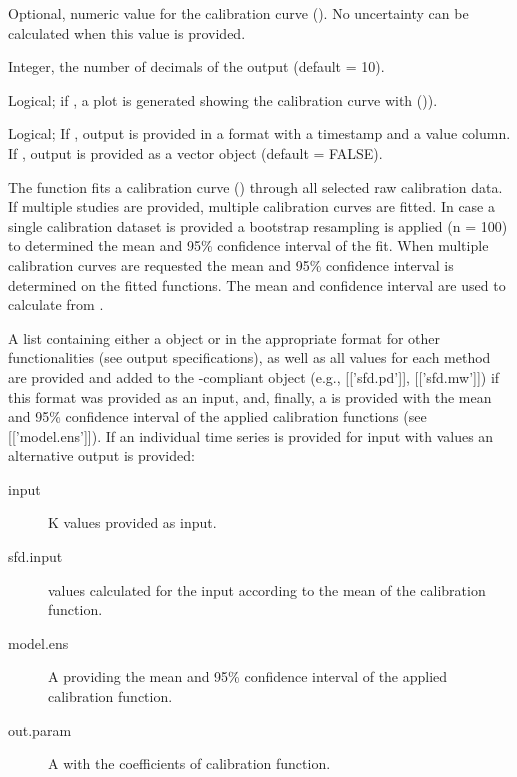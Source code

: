 \documentclass[a4paper]{book}
\begin{document}
\begin{Arguments}
\begin{ldescription}
\item[\code{b}] Optional, numeric value for the calibration curve ().
No uncertainty can be calculated when this value is provided.

\item[\code{decimals}] Integer, the number of decimals of the output (default = 10).

\item[\code{make.plot}] Logical; if , a plot is generated showing
the calibration curve with  ()).

\item[\code{df}] Logical; If , output is provided in a  format
with a timestamp and a value column. If , output
is provided as a  vector object (default = FALSE).
\end{ldescription}
\end{Arguments}
%
\begin{Details}\relax
The function fits a calibration curve ()
through all selected raw calibration data. If multiple studies are provided,
multiple calibration curves are fitted. In case a single calibration dataset
is provided a bootstrap resampling is applied (n = 100) to determined the
mean and 95\% confidence interval of the fit. When multiple calibration curves
are requested the mean and 95\% confidence interval is determined on the fitted functions.
The mean and confidence interval are used to calculate  from .
\end{Details}
%
\begin{Value}
A list containing either a  object or  in the appropriate format
for other functionalities (see  output specifications), as well as
all  values for each method are provided and added to the
-compliant object (e.g., [['sfd.pd']], [['sfd.mw']])
if this format was provided as an input, and,
finally, a  is provided with the mean and 95\% confidence
interval of the applied calibration functions (see [['model.ens']]).
If an individual time series is provided for input with  values an alternative output is provided:

\begin{description}

\item[input] K values provided as input.
\item[sfd.input]  values calculated for the input according to the mean of the calibration function.
\item[model.ens] A  providing the mean and 95\% confidence interval of the applied calibration function.
\item[out.param] A  with the coefficients of calibration function.

\end{description}

\end{Value}
\end{document}
